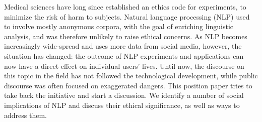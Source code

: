 Medical sciences have long since established an ethics code for experiments, to minimize the risk of harm to subjects. Natural language processing (NLP) used to involve mostly anonymous corpora, with the goal of enriching linguistic analysis, and was therefore unlikely to raise ethical concerns. As NLP becomes increasingly wide-spread and uses more data from social media, however, the situation has changed: the outcome of NLP experiments and applications can now have a direct effect on individual users' lives. Until now, the discourse on this topic in the field has not followed the technological development, while public discourse was often focused on exaggerated dangers. This position paper tries to take back the initiative and start a discussion. We identify a number of social implications of NLP and discuss their ethical significance, as well as ways to address them.
